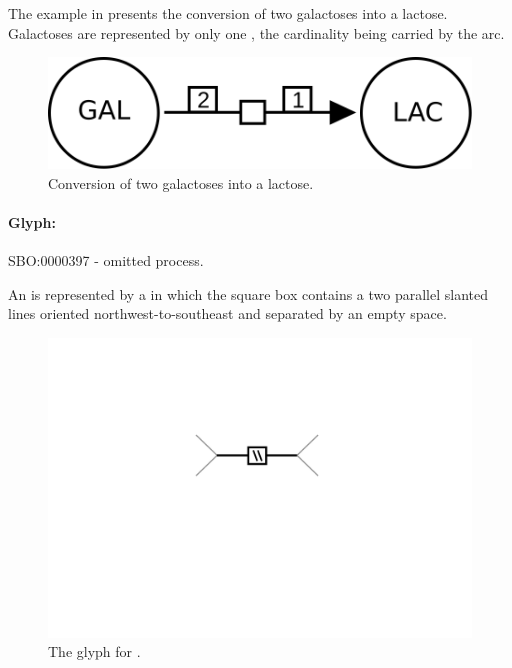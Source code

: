 The example in  presents the conversion of two galactoses into a lactose.  Galactoses are represented by only one , the cardinality being carried by the  arc.

\begin{figure}[H]
  \centering
  \includegraphics[scale = 0.3]{examples/process-dimerisation}
  \caption{Conversion of two galactoses into a lactose.}
  \label{fig:trans-dim}
\end{figure}



\paragraph{Glyph: }\label{sec:omitted}


\begin{glyphDescription}
 \glyphSboTerm SBO:0000397 - omitted process.

 \glyphNode An  is represented by a  in which the square box contains a two parallel slanted lines oriented northwest-to-southeast and separated by an empty space.
 \end{glyphDescription}

\begin{figure}[H]
  \centering
  \includegraphics[scale = 0.5]{images/omitted}
  \caption{The \PD glyph for .}
  \label{fig:omitted}
\end{figure}


